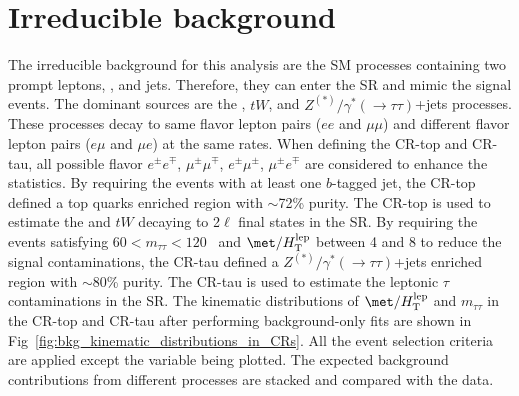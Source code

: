 \section{Irreducible background}
\label{sec:bkg_irreducible_background}
The irreducible background for this analysis are the SM processes containing two prompt leptons, \met, and jets.
Therefore, they can enter the SR and mimic the signal events.
The dominant sources are the \ttbar, $tW$, and $Z^{(*)}/\gamma^{*}(\to \tau \tau)$+jets processes.
These processes decay to same flavor lepton pairs ($ee$ and $\mu \mu$) and different flavor lepton pairs ($e \mu$ and $\mu e$) at the same rates.
When defining the CR-top and CR-tau, all possible flavor $e^{\pm} e^{\mp}$, $\mu^{\pm} \mu^{\mp}$, $e^{\pm} \mu^{\pm}$, $\mu^{\pm} e^{\mp}$ are considered to enhance the statistics.
By requiring the events with at least one $b$-tagged jet, the CR-top defined a top quarks enriched region with $\sim$72\% purity.
The CR-top is used to estimate the \ttbar and $tW$ decaying to 2$\ell$ final states in the SR.
By requiring the events satisfying $60 < m_{\tau \tau} < 120$~{\GeV} and $\met/H_{\mathrm{T}}^{\mathrm{lep}}$ between 4 and 8 to reduce the signal contaminations, the CR-tau defined a $Z^{(*)}/\gamma^{*}(\to \tau \tau)$+jets enriched region with $\sim$80\% purity.
The CR-tau is used to estimate the leptonic $\tau$ contaminations in the SR.
The kinematic distributions of $\met/H_\mathrm{T}^\mathrm{lep}$ and $m_{\tau \tau}$ in the CR-top and CR-tau after performing background-only fits are shown in Fig~\ref{fig:bkg_kinematic_distributions_in_CRs}.
All the event selection criteria are applied except the variable being plotted.
The expected background contributions from different processes are stacked and compared with the data.

